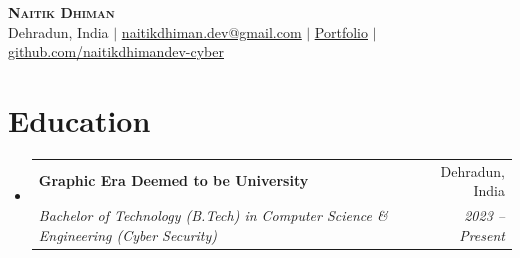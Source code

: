 \documentclass[letterpaper,11pt]{article}
\makeatletter
\newcommand{\resumeSubheading}[4]{
  \vspace{-2pt}\item
    \begin{tabular*}{\textwidth}[t]{l@{\extracolsep{\fill}}r}
      \textbf{#1} & #2 \\
      \textit{\small#3} & \textit{\small #4} \\
    \end{tabular*}\vspace{-7pt}
}
\newenvironment{itemList}{\begin{itemize}[leftmargin=0.15in, label={}]}{\end{itemize}}
\makeatother
\begin{document}
\begin{center}
    \textbf{\Huge \scshape Naitik Dhiman} \\ \vspace{3pt}
    \small Dehradun, India $|$ \href{mailto:naitikdhiman.dev@gmail.com}{\underline{naitikdhiman.dev@gmail.com}} $|$ 
    \href{https://naitikdhimandev-cyber.github.io/Portfolio/}{\underline{Portfolio}} $|$ 
    \href{https://github.com/naitikdhimandev-cyber}{\underline{github.com/naitikdhimandev-cyber}}
\end{center}


\section{Education}
  \begin{itemList}
    \resumeSubheading
      {Graphic Era Deemed to be University}{Dehradun, India}
      {Bachelor of Technology (B.Tech) in Computer Science \& Engineering (Cyber Security)}{2023 -- Present}
  \end{itemList}


\end{document}

